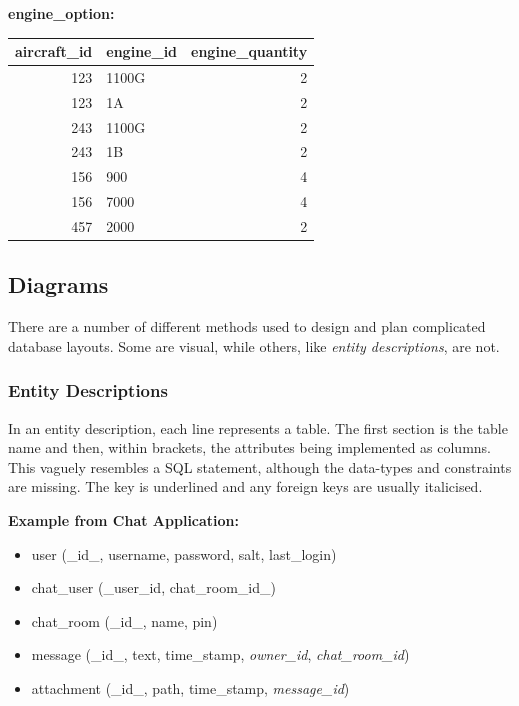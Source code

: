 \documentclass[9pt]{article}
\begin{document}
\textbf{engine\_option:}

\begin{center}
\begin{tabular}{rlr}
\hline
aircraft\_id & engine\_id & engine\_quantity\\
\hline
123 & 1100G & 2\\
123 & 1A & 2\\
243 & 1100G & 2\\
243 & 1B & 2\\
156 & 900 & 4\\
156 & 7000 & 4\\
457 & 2000 & 2\\
\hline
\end{tabular}
\end{center}

\subsection{Diagrams}
\label{sec:orgedf571a}

There are a number of different methods used to design and plan complicated database layouts. Some are visual, while others, like \emph{entity descriptions}, are not.

\subsubsection{Entity Descriptions}
\label{sec:org3ecaa0d}

In an entity description, each line represents a table. The first section is the table name and then, within brackets, the attributes being implemented as columns. This vaguely resembles a SQL statement, although the data-types and constraints are missing. The key is underlined and any foreign keys are usually italicised.

\textbf{Example from Chat Application:}

\begin{itemize}
\item user (\_id\_, username, password, salt, last\_login)
\item chat\_user (\_user\_id, chat\_room\_id\_)
\item chat\_room (\_id\_, name, pin)
\item message (\_id\_,  text, time\_stamp, \emph{owner\_id}, \emph{chat\_room\_id})
\item attachment (\_id\_, path, time\_stamp, \emph{message\_id})
\end{itemize}
\end{document}
